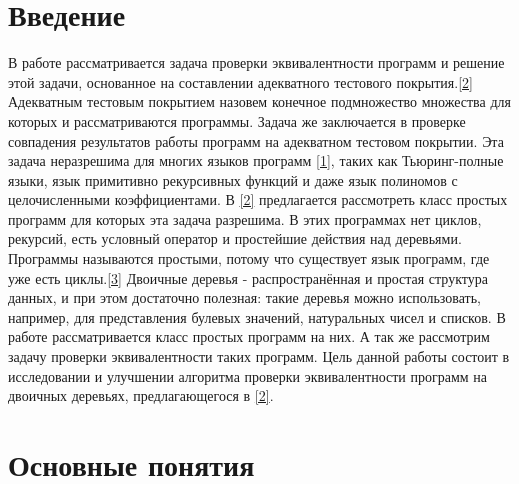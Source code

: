 \documentclass[12pt]{article}
\begin{document}
\coursePutTitleContents

\section{Введение}
В работе рассматривается задача проверки эквивалентности программ и решение этой задачи, основанное на составлении адекватного тестового покрытия.\hyperlink{bibl2}{[2]} Адекватным тестовым покрытием назовем конечное подмножество множества для которых и рассматриваются программы. Задача же заключается в проверке совпадения результатов работы программ на адекватном тестовом покрытии. Эта задача неразрешима для многих языков программ \hyperlink{bibl1}{[1]}, таких как Тьюринг-полные языки, язык примитивно рекурсивных функций и даже язык полиномов с целочисленными коэффициентами. В \hyperlink{bibl2}{[2]} предлагается рассмотреть класс простых программ для которых эта задача разрешима. В этих программах нет циклов, рекурсий, есть условный оператор и простейшие действия над деревьями. Программы называются простыми, потому что существует язык программ, где уже есть циклы.\hyperlink{bibl3}{[3]} Двоичные деревья - распространённая и простая структура данных, и при этом достаточно полезная: такие деревья можно использовать, например, для представления булевых значений, натуральных чисел и списков. В работе рассматривается класс простых программ на них. А так же рассмотрим задачу проверки эквивалентности таких программ. Цель данной работы состоит в исследовании и улучшении алгоритма проверки эквивалентности программ на двоичных деревьях, предлагающегося в \hyperlink{bibl2}{[2]}.
\pagebreak

\section{Основные понятия}
\end{document}
